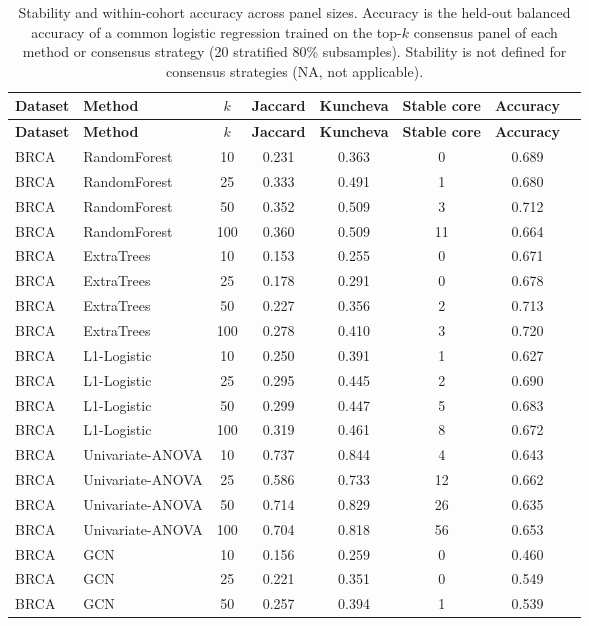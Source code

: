 \documentclass[utf8]{frontiers_suppmat}
\begin{document}
\begin{longtable}{llcccccc}
\caption{Stability and within-cohort accuracy across panel sizes. Accuracy is the held-out balanced accuracy of a common logistic regression trained on the top-$k$ consensus panel of each method or consensus strategy (20 stratified 80\% subsamples). Stability is not defined for consensus strategies (NA, not applicable).}\label{tab:S5}\\
\hline
\textbf{Dataset} & \textbf{Method} & \textbf{$k$} & \textbf{Jaccard} & \textbf{Kuncheva} & \textbf{Stable core} & \textbf{Accuracy} \\
\hline
\endfirsthead
\hline
\textbf{Dataset} & \textbf{Method} & \textbf{$k$} & \textbf{Jaccard} & \textbf{Kuncheva} & \textbf{Stable core} & \textbf{Accuracy} \\
\hline
\endhead
\hline
\endfoot
BRCA & RandomForest & 10 & 0.231 & 0.363 & 0 & 0.689 \\
BRCA & RandomForest & 25 & 0.333 & 0.491 & 1 & 0.680 \\
BRCA & RandomForest & 50 & 0.352 & 0.509 & 3 & 0.712 \\
BRCA & RandomForest & 100 & 0.360 & 0.509 & 11 & 0.664 \\
BRCA & ExtraTrees & 10 & 0.153 & 0.255 & 0 & 0.671 \\
BRCA & ExtraTrees & 25 & 0.178 & 0.291 & 0 & 0.678 \\
BRCA & ExtraTrees & 50 & 0.227 & 0.356 & 2 & 0.713 \\
BRCA & ExtraTrees & 100 & 0.278 & 0.410 & 3 & 0.720 \\
BRCA & L1-Logistic & 10 & 0.250 & 0.391 & 1 & 0.627 \\
BRCA & L1-Logistic & 25 & 0.295 & 0.445 & 2 & 0.690 \\
BRCA & L1-Logistic & 50 & 0.299 & 0.447 & 5 & 0.683 \\
BRCA & L1-Logistic & 100 & 0.319 & 0.461 & 8 & 0.672 \\
BRCA & Univariate-ANOVA & 10 & 0.737 & 0.844 & 4 & 0.643 \\
BRCA & Univariate-ANOVA & 25 & 0.586 & 0.733 & 12 & 0.662 \\
BRCA & Univariate-ANOVA & 50 & 0.714 & 0.829 & 26 & 0.635 \\
BRCA & Univariate-ANOVA & 100 & 0.704 & 0.818 & 56 & 0.653 \\
BRCA & GCN & 10 & 0.156 & 0.259 & 0 & 0.460 \\
BRCA & GCN & 25 & 0.221 & 0.351 & 0 & 0.549 \\
BRCA & GCN & 50 & 0.257 & 0.394 & 1 & 0.539 \\

\end{longtable}
\end{document}
